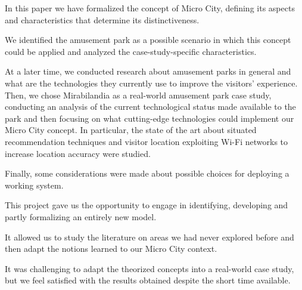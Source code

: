 In this paper we have formalized the concept of Micro City, defining its aspects and characteristics that determine its distinctiveness. 

We identified the amusement park as a possible scenario in which this concept could be applied and analyzed the case-study-specific characteristics.

At a later time, we conducted research about amusement parks in general and what are the technologies they currently use to improve the visitors' experience.
Then, we chose Mirabilandia as a real-world amusement park case study, conducting an analysis of the current technological status made available to the park and then focusing on what cutting-edge technologies could implement our Micro City concept.
In particular, the state of the art about situated recommendation techniques and visitor location exploiting Wi-Fi networks to increase location accuracy were studied. 

Finally, some considerations were made about possible choices for deploying a working system.

This project gave us the opportunity to engage in identifying, developing and partly formalizing an entirely new model. 

It allowed us to study the literature on areas we had never explored before and then adapt the notions learned to our Micro City context.

It was challenging to adapt the theorized concepts into a real-world case study, but we feel satisfied with the results obtained despite the short time available.
